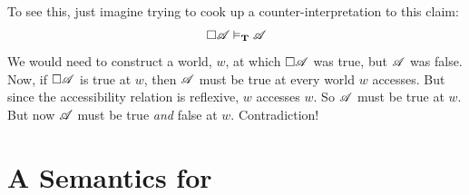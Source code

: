 To see this, just imagine trying to cook up a counter-interpretation to this claim:
\[
	\Box \mathscr{A}\vDash_{\mathbf{T}} \mathscr{A}
\]
We would need to construct a world, $w$, at which $\Box \mathscr{A}$ was true, but $\mathscr{A}$ was false. Now, if $\Box \mathscr{A}$ is true at $w$, then $\mathscr{A}$ must be true at every world $w$ accesses. But since the accessibility relation is reflexive, $w$ accesses $w$. So $\mathscr{A}$ must be true at $w$. But now $\mathscr{A}$ must be true \emph{and} false at $w$. Contradiction!

\section{A Semantics for \mlSfour}
\label{SemanticsS4}

